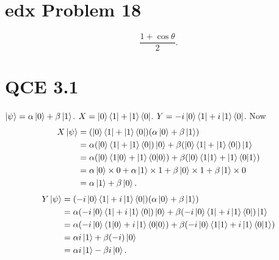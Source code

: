 \documentclass[10pt]{article}
\begin{document}
\section*{edx Problem 18}
\[
\frac{1 + \cos \theta}{2}.
\]

\section*{QCE 3.1}
$\ket{\psi} = \alpha \ket{0} + \beta \ket{1}$. $X = \ket{0} \bra{1} + \ket{1} \bra{0}$. $Y  = -i\ket{0} \bra{1} + i\ket{1} \bra{0}$. Now
\begin{align*}
X\ket{\psi} &= (\ket{0} \bra{1} + \ket{1} \bra{0}) (\alpha \ket{0} + \beta \ket{1}) \\
                  &= \alpha ( \ket{0} \bra{1} + \ket{1} \bra{0}) \ket{0} + \beta ( \ket{0} \bra{1} + \ket{1} \bra{0} ) \ket{1} \\
                  &= \alpha (\ket{0} \braket{ 1 | 0 } + \ket{1} \braket{ 0 | 0 }) + \beta ( \ket{0} \braket{ 1 | 1 } + \ket{1}  \braket{ 0 | 1 }) \\
                  &= \alpha \ket{0} \times 0 + \alpha \ket{1} \times 1 + \beta \ket{0} \times 1 + \beta \ket{1} \times 0 \\
                  &= \alpha \ket{1} + \beta \ket{0}.
\end{align*}
\begin{align*}
Y \ket{\psi} &= (-i \ket{0} \bra{1} + i \ket{1} \bra{0}) (\alpha \ket{0} + \beta \ket{1}) \\
                  &= \alpha (-i \ket{0} \bra{1} + i \ket{1} \bra{0}) \ket{0} + \beta ( -i \ket{0} \bra{1} + i \ket{1} \bra{0} ) \ket{1} \\
                  &= \alpha ( -i \ket{0} \braket{ 1 | 0 } + i \ket{1} \braket{ 0 | 0 } ) + \beta ( -i \ket{0} \braket{ 1 | 1 } + i \ket{1} \braket{ 0 | 1 }  ) \\
                  &= \alpha i \ket{1} + \beta (-i) \ket{0} \\
                  &= \alpha i \ket{1} - \beta i \ket{0}.
\end{align*}
\end{document}

